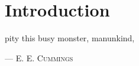 \chapter*{Introduction}

\epigraph{
pity this busy monster, manunkind,
    }{
    --- \textsc{E. E. Cummings}}

